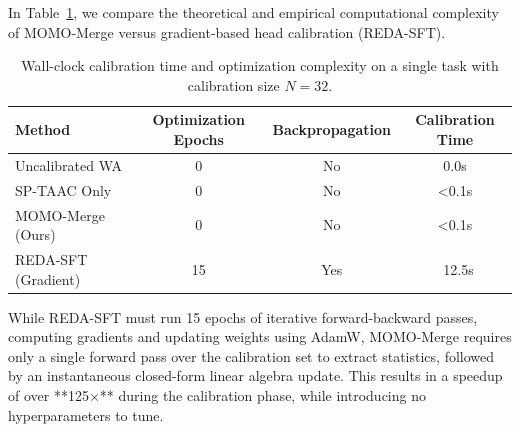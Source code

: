 \documentclass{article}
\theoremstyle{plain}
\theoremstyle{definition}
\theoremstyle{remark}
\begin{document}
In Table~\ref{tab:wall_clock}, we compare the theoretical and empirical computational complexity of MOMO-Merge versus gradient-based head calibration (REDA-SFT).

\begin{table}[h]
\caption{Wall-clock calibration time and optimization complexity on a single task with calibration size $N=32$.}
\label{tab:wall_clock}
\vskip 0.15in
\begin{center}
\begin{small}
\begin{sc}
\begin{tabular}{lccc}
\toprule
Method & Optimization Epochs & Backpropagation & Calibration Time \\
\midrule
Uncalibrated WA & 0 & No & 0.0s \\
SP-TAAC Only & 0 & No & <0.1s \\
MOMO-Merge (Ours) & 0 & No & <0.1s \\
REDA-SFT (Gradient) & 15 & Yes & ~12.5s \\
\bottomrule
\end{tabular}
\end{sc}
\end{small}
\end{center}
\vskip -0.1in
\end{table}

While REDA-SFT must run 15 epochs of iterative forward-backward passes, computing gradients and updating weights using AdamW, MOMO-Merge requires only a single forward pass over the calibration set to extract statistics, followed by an instantaneous closed-form linear algebra update. This results in a speedup of over **125$\times$** during the calibration phase, while introducing no hyperparameters to tune.
\end{document}
